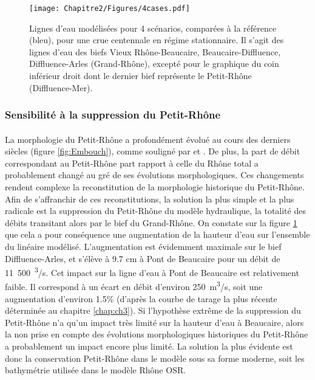 			
	\begin{figure}[h]
		\centering
		\texttt{[image: Chapitre2/Figures/4cases.pdf]}
        \caption{Lignes d'eau modélisées pour 4 scénarios, comparées à la référence (bleu), pour une crue centennale en régime stationnaire. Il s'agit des lignes d'eau des biefs Vieux Rhône-Beaucaire, Beaucaire-Diffluence, Diffluence-Arles (Grand-Rhône), excepté pour le graphique du coin inférieur droit dont le dernier bief représente le Petit-Rhône (Diffluence-Mer).}
		\label{fig:Sensib4}
	\end{figure}		
		
	\subsubsection{Sensibilité à la suppression du Petit-Rhône} 
	
	\paragraph{} La morphologie du Petit-Rhône a profondément évolué au cours des derniers siècles (figure \ref{fig:Embouch}), comme souligné par \citet{pichard_les_2014} et \citet{raccasi_mutations_2008}. De plus, la part de débit correspondant au Petit-Rhône part rapport à celle du Rhône total a probablement changé au gré de ses évolutions morphologiques. Ces changements rendent complexe la reconstitution de la morphologie historique du Petit-Rhône. Afin de s'affranchir de ces reconstitutions, la solution la plus simple et la plus radicale est la suppression du Petit-Rhône du modèle hydraulique, la totalité des débits transitant alors par le bief du Grand-Rhône. On constate sur la figure \ref{fig:Sensib4} que cela a pour conséquence une augmentation de la hauteur d'eau sur l'ensemble du linéaire modélisé. L'augmentation est évidemment maximale sur le bief Diffluence-Arles, et s'élève à 9.7 cm à Pont de Beaucaire pour un débit de 11~500~\textsuperscript{3}/s. Cet impact sur la ligne d'eau à Pont de Beaucaire est relativement faible. Il correspond à un écart en débit d'environ 250~m\textsuperscript{3}/s, soit une augmentation d'environ 1.5\% (d'après la courbe de tarage la plus récente déterminée au chapitre \ref{chap:ch3}). Si l'hypothèse extrême de la suppression du Petit-Rhône n'a qu'un impact très limité sur la hauteur d'eau à Beaucaire, alors la non prise en compte des évolutions morphologiques historiques du Petit-Rhône a probablement un impact encore plus limité. La solution la plus évidente est donc la conservation Petit-Rhône dans le modèle sous sa forme moderne, soit les bathymétrie utilisée dans le modèle Rhône OSR.
	
